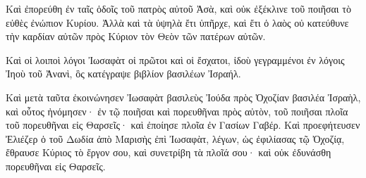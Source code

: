 {Καὶ ἐπορεύθη ἐν ταῖς ὁδοῖς τοῦ πατρὸς αὐτοῦ Ἀσὰ, καὶ οὐκ ἐξέκλινε τοῦ ποιῆσαι τὸ εὐθὲς ἐνώπιον Κυρίου.
Ἀλλὰ καὶ τὰ ὑψηλὰ ἔτι ὑπῆρχε, καὶ ἔτι ὁ λαὸς οὐ κατεύθυνε τὴν καρδίαν αὐτῶν πρὸς Κύριον τὸν Θεὸν τῶν πατέρων αὐτῶν.
\par }{\PP {}Καὶ οἱ λοιποὶ λόγοι Ἰωσαφὰτ οἱ πρῶτοι καὶ οἱ ἔσχατοι, ἰδοὺ γεγραμμένοι ἐν λόγοις Ἰηοὺ τοῦ Ἀνανὶ, ὃς κατέγραψε βιβλίον βασιλέων Ἰσραήλ.
\par }{\PP {}Καὶ μετὰ ταῦτα ἐκοινώνησεν Ἰωσαφὰτ βασιλεὺς Ἰούδα πρὸς Ὀχοζίαν βασιλέα Ἰσραὴλ, καὶ οὗτος ἠνόμησεν·
ἐν τῷ ποιῆσαι καὶ πορευθῆναι πρὸς αὐτὸν, τοῦ ποιῆσαι πλοῖα τοῦ πορευθῆναι εἰς Θαρσεῖς· καὶ ἐποίησε πλοῖα ἐν Γασίων Γαβέρ.
Καὶ προεφήτευσεν Ἐλιέζερ ὁ τοῦ Δωδία ἀπὸ Μαρισὴς ἐπὶ Ἰωσαφὰτ, λέγων, ὡς ἐφιλίασας τῷ Ὀχοζίᾳ, ἔθραυσε Κύριος τὸ ἔργον σου, καὶ συνετρίβη τὰ πλοῖά σου· καὶ οὐκ ἐδυνάσθη πορευθῆναι εἰς Θαρσεῖς.

}
